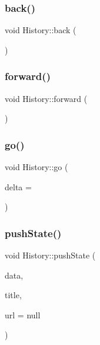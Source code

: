 \subsubsection{\texorpdfstring{back()}{back()}}
{\footnotesize\ttfamily void History\+::back (\begin{DoxyParamCaption}{ }\end{DoxyParamCaption})}

\mbox{\label{interface_history_a7ca8f883833b6c40b5210a0ee5692b57}} 
\subsubsection{\texorpdfstring{forward()}{forward()}}
{\footnotesize\ttfamily void History\+::forward (\begin{DoxyParamCaption}{ }\end{DoxyParamCaption})}

\mbox{\label{interface_history_ae962804635b0bae91b7695a94e5f4f26}} 
\subsubsection{\texorpdfstring{go()}{go()}}
{\footnotesize\ttfamily void History\+::go (\begin{DoxyParamCaption}\item[{optional long}]{delta = {} }\end{DoxyParamCaption})}

\mbox{\label{interface_history_ad9664de1d61512f87064f6d8d3e6ace1}} 
\subsubsection{\texorpdfstring{push\+State()}{pushState()}}
{\footnotesize\ttfamily void History\+::push\+State (\begin{DoxyParamCaption}\item[{any}]{data,  }\item[{D\+O\+M\+String}]{title,  }\item[{optional D\+O\+M\+String?}]{url = {\ttfamily null} }\end{DoxyParamCaption})}

